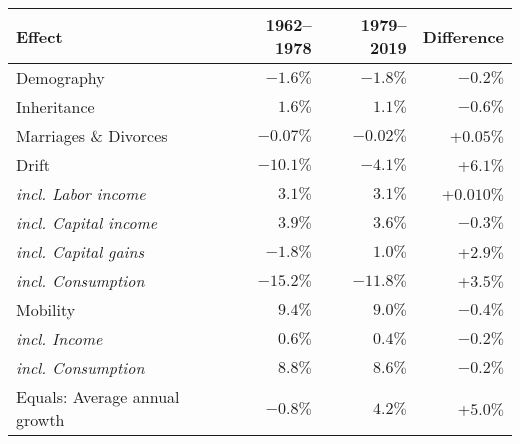 \begin{table}[ht]
\centering
\begin{tabular}{lrrr}
  \toprule
Effect & 1962--1978 & 1979--2019 & Difference \\ 
  \midrule
Demography & $-1.6\%$ & $-1.8\%$ & $-0.2\%$ \\ 
   [0.5em]Inheritance & $1.6\%$ & $1.1\%$ & $-0.6\%$ \\ 
   [0.5em]Marriages \& Divorces & $-0.07\%$ & $-0.02\%$ & +$0.05\%$ \\ 
   [0.5em]Drift & $-10.1\%$ & $-4.1\%$ & +$6.1\%$ \\ 
  \quad \textit{incl. Labor income} & $3.1\%$ & $3.1\%$ & +$0.010\%$ \\ 
  \quad \textit{incl. Capital income} & $3.9\%$ & $3.6\%$ & $-0.3\%$ \\ 
  \quad \textit{incl. Capital gains} & $-1.8\%$ & $1.0\%$ & +$2.9\%$ \\ 
  \quad \textit{incl. Consumption} & $-15.2\%$ & $-11.8\%$ & +$3.5\%$ \\ 
   [0.5em]Mobility & $9.4\%$ & $9.0\%$ & $-0.4\%$ \\ 
  \quad \textit{incl. Income} & $0.6\%$ & $0.4\%$ & $-0.2\%$ \\ 
  \quad \textit{incl. Consumption} & $8.8\%$ & $8.6\%$ & $-0.2\%$ \\ 
   \midrule
Equals: Average annual growth & $-0.8\%$ & $4.2\%$ & +$5.0\%$ \\ 
   \bottomrule
\end{tabular}
\end{table}
